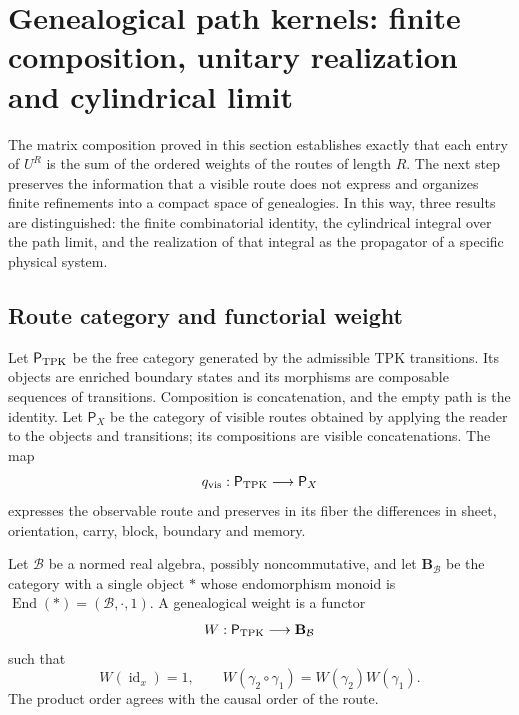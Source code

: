\section{Genealogical path kernels: finite composition, unitary realization and cylindrical limit}
\label{sec:integral-genealogica-caminos-rev2}

The matrix composition proved in this section establishes exactly that each entry of
\(U^R\) is the sum of the ordered weights of the routes of length \(R\).
The next step preserves the information that a visible route does not express and
organizes finite refinements into a compact space of genealogies. In
this way, three results are distinguished: the finite combinatorial identity, the
cylindrical integral over the path limit, and the realization of that
integral as the propagator of a specific physical system.

\subsection{Route category and functorial weight}

Let \(\mathsf P_{\rm TPK}\) be the free category generated by the admissible
TPK transitions. Its objects are enriched boundary states and its
morphisms are composable sequences of transitions. Composition is
concatenation, and the empty path is the identity. Let \(\mathsf P_X\)
be the category of visible routes obtained by applying the reader to the
objects and transitions; its compositions are visible concatenations.
The map
\[
 q_{\rm vis}:\mathsf P_{\rm TPK}\longrightarrow\mathsf P_X
\]
expresses the observable route and preserves in its fiber the differences in sheet,
orientation, carry, block, boundary and memory.

\begin{definition}
\label{def:peso-genealogico-caminos-rev2}
Let \(\mathcal B\) be a normed real algebra, possibly noncommutative, and
let \(\mathbf B_{\mathcal B}\) be the category with a single object \(\ast\) whose
endomorphism monoid is
\(\operatorname{End}(\ast)=(\mathcal B,\cdot,1)\). A genealogical weight is a functor
\[
 W:\mathsf P_{\rm TPK}\longrightarrow\mathbf B_{\mathcal B}
\]
such that
\[
 W(\operatorname{id}_x)=1,
 \qquad
 W(\gamma_2\circ\gamma_1)=W(\gamma_2)W(\gamma_1).
\]
The product order agrees with the causal order of the route.
\end{definition}

